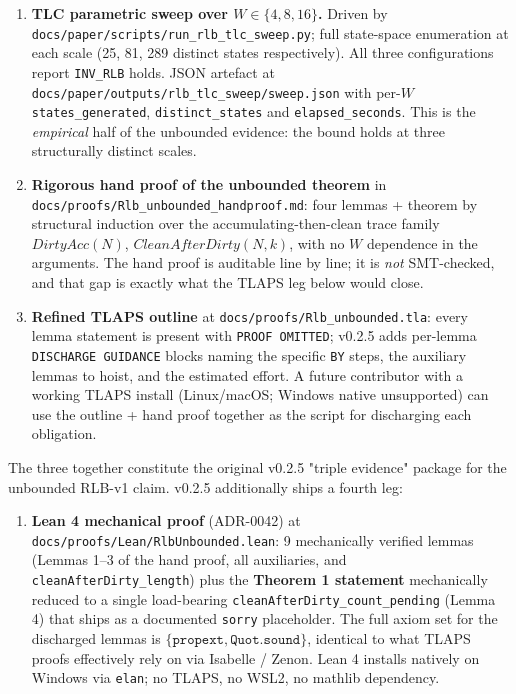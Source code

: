 \documentclass[acmsmall,nonacm=true,review=false]{acmart}
\theoremstyle{plain}
\begin{document}
\begin{enumerate}[noitemsep,topsep=2pt]
  \item \textbf{TLC parametric sweep over $W \in \{4, 8, 16\}$.}
        Driven by
        \texttt{docs/paper/scripts/run\_rlb\_tlc\_sweep.py}; full
        state-space enumeration at each scale (25, 81, 289
        distinct states respectively). All three configurations
        report \texttt{INV\_RLB} holds. JSON artefact at
        \texttt{docs/paper/outputs/rlb\_tlc\_sweep/sweep.json}
        with per-$W$ \texttt{states\_generated},
        \texttt{distinct\_states} and \texttt{elapsed\_seconds}.
        This is the \emph{empirical} half of the unbounded
        evidence: the bound holds at three structurally distinct
        scales.
  \item \textbf{Rigorous hand proof of the unbounded theorem}
        in
        \texttt{docs/proofs/Rlb\_unbounded\_handproof.md}: four
        lemmas + theorem by structural induction over the
        accumulating-then-clean trace family
        $\mathit{DirtyAcc}(N)$, $\mathit{CleanAfterDirty}(N, k)$,
        with no $W$ dependence in the arguments. The hand proof
        is auditable line by line; it is \emph{not} SMT-checked,
        and that gap is exactly what the TLAPS leg below would
        close.
  \item \textbf{Refined TLAPS outline} at
        \texttt{docs/proofs/Rlb\_unbounded.tla}: every lemma
        statement is present with \texttt{PROOF OMITTED};
        v0.2.5 adds per-lemma \texttt{DISCHARGE GUIDANCE}
        blocks naming the specific \texttt{BY} steps, the
        auxiliary lemmas to hoist, and the estimated effort.
        A future contributor with a working TLAPS install
        (Linux/macOS; Windows native unsupported) can use the
        outline + hand proof together as the script for
        discharging each obligation.
\end{enumerate}

The three together constitute the original v0.2.5 "triple
evidence" package for the unbounded RLB-v1 claim. v0.2.5
additionally ships a fourth leg:

\begin{enumerate}[noitemsep,topsep=2pt,start=4]
  \item \textbf{Lean 4 mechanical proof} (ADR-0042) at
        \texttt{docs/proofs/Lean/RlbUnbounded.lean}: 9
        mechanically verified lemmas (Lemmas 1--3 of the hand
        proof, all auxiliaries, and \texttt{cleanAfterDirty\_length})
        plus the \textbf{Theorem 1 statement} mechanically
        reduced to a single load-bearing
        \texttt{cleanAfterDirty\_count\_pending} (Lemma 4) that
        ships as a documented \texttt{sorry} placeholder. The
        full axiom set for the discharged lemmas is
        $\{\texttt{propext}, \texttt{Quot.sound}\}$, identical to
        what TLAPS proofs effectively rely on via Isabelle / Zenon.
        Lean 4 installs natively on Windows via \texttt{elan}; no
        TLAPS, no WSL2, no mathlib dependency.
\end{enumerate}
\end{document}

